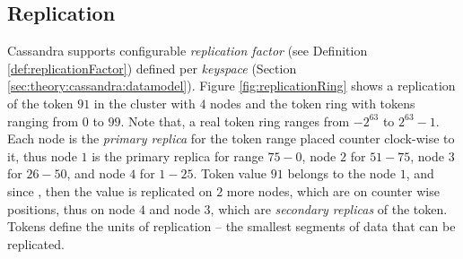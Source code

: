 \subsection{Replication}
Cassandra supports configurable \emph{replication factor} (see Definition \ref{def:replicationFactor}) defined per \emph{keyspace} (Section \ref{sec:theory:cassandra:datamodel}). Figure \ref{fig:replicationRing} shows a replication of the token $91$ in the cluster with $4$ nodes and the token ring with tokens ranging from $0$ to $99$. 
Note that, a real token ring ranges from $-2^{63}$ to $2^{63}-1$.
Each node is the \emph{primary replica} for the token range placed counter clock-wise to it, thus node $1$ is the primary replica for range $75-0$, node $2$ for $51-75$, node $3$ for $26-50$, and node $4$ for $1-25$. 
Token value $91$ belongs to the node $1$, and since , then the value is replicated on $2$ more nodes, which are on counter wise positions, thus on node $4$ and node $3$, which are \emph{secondary replicas} of the token. Tokens define the units of replication -- the smallest segments of data that can be replicated. 



